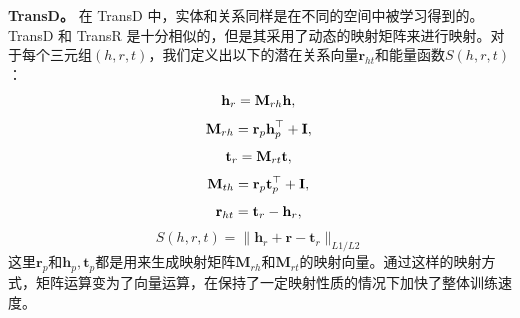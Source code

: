 \textbf{TransD。} 在 TransD 中，实体和关系同样是在不同的空间中被学习得到的。TransD 和 TransR 是十分相似的，但是其采用了动态的映射矩阵来进行映射。对于每个三元组$(h, r, t)$，我们定义出以下的潜在关系向量$\textbf{r}_{ht}$和能量函数$S(h,r,t)$：
\begin{equation}
\textbf{h}_{r} = \textbf{M}_{rh}\textbf{h}, \\\nonumber
\end{equation}
\begin{equation}
\textbf{M}_{rh} = \textbf{r}_p\textbf{h}_p^{\top}+\textbf{I}, \\\nonumber
\end{equation}
\begin{equation}
\textbf{t}_{r} = \textbf{M}_{rt}\textbf{t},  \\\nonumber
\end{equation}
\begin{equation}
\textbf{M}_{th} = \textbf{r}_p\textbf{t}_p^{\top}+\textbf{I}, \\\nonumber
\end{equation}
\begin{equation}
\textbf{r}_{ht} = \textbf{t}_r - \textbf{h}_r,  \\\nonumber
\end{equation}
\begin{equation}
S(h, r, t) = \lVert \textbf{h}_r + \textbf{r} - \textbf{t}_r \rVert_{L1/L2}
\end{equation}
这里$\textbf{r}_p$和$\textbf{h}_p, \textbf{t}_p$都是用来生成映射矩阵$\textbf{M}_{rh}$和$\textbf{M}_{rt}$的映射向量。通过这样的映射方式，矩阵运算变为了向量运算，在保持了一定映射性质的情况下加快了整体训练速度。

